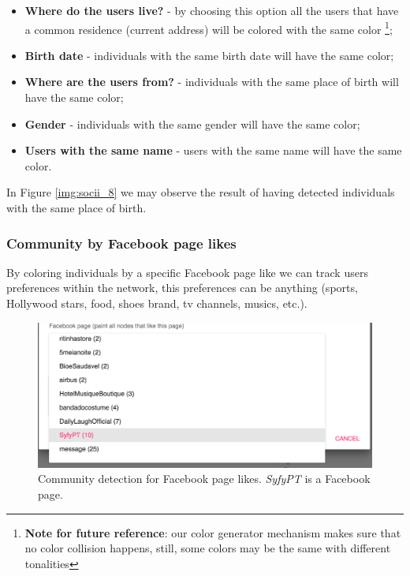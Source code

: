 \begin{itemize}
    \item \textbf{Where do the users live?} - by choosing this option all the users that have a common residence (current address) will be colored with the same color \footnote{\textbf{Note for future reference}: our color generator mechanism makes sure that no color collision happens, still, some colors may be the same with different tonalities};
    \item \textbf{Birth date} - individuals with the same birth date will have the same color;
    \item \textbf{Where are the users from?} - individuals with the same place of birth will have the same color;
    \item \textbf{Gender} - individuals with the same gender will have the same color;
    \item \textbf{Users with the same name} - users with the same name will have the same color.
\end{itemize}

In Figure \ref{img:socii_8} we may observe the result of having detected individuals with the same place of birth.

\subsubsection*{Community by Facebook page likes}

By coloring individuals by a specific Facebook page like we can track users preferences within the network, this preferences can be anything (sports, Hollywood stars, food, shoes brand, tv channels, musics, etc.).

\begin{figure}[h!]
\begin{center}
  \hspace*{-0.8in}
  \includegraphics[width=1.2\textwidth]{img/socii/socii_9.png}
\end{center}
\caption{\label{img:socii_9} Community detection for Facebook page likes. \textit{SyfyPT} is a Facebook page.}
\end{figure}

